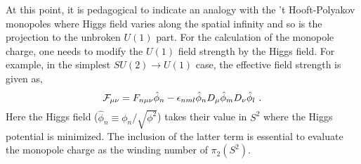 \documentclass[a4paper,12pt]{article}
\begin{document}

At this point, it is pedagogical to
indicate an analogy with the 't Hooft-Polyakov monopoles 
\cite{r:monopole} where Higgs field varies along the spatial infinity
and so is the projection to the unbroken $U(1)$ part.
For the calculation of the monopole charge, one needs to modify
the $U(1)$ field strength by the Higgs field.  For example,
in the simplest $SU(2)\rightarrow U(1)$ case, the effective
field strength is given as,
\begin{equation}
 {\cal F}_{\mu\nu} = F_{n\mu\nu} \hat\phi_n - \epsilon_{nml}
\hat\phi_n D_\mu \hat\phi_m D_\nu \hat\phi_l\,\,.
\end{equation}
Here the Higgs field ($\hat\phi_n\equiv
\phi_n/\sqrt{\phi^2}$) takes their value in $S^2$
where the Higgs potential is minimized. 
The inclusion of the latter term is essential to
evaluate the monopole charge as the
winding number of $\pi_2(S^2)$.
\end{document}
